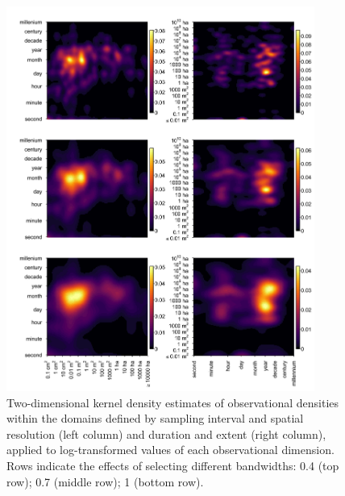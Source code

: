 \documentclass[12pt]{article}
\begin{document}
\begin{figure}[!ht]
\includegraphics[width=0.9\textwidth]{../vignettes/figures/figS6.png}
\vspace{10 pt}
\caption{Two-dimensional kernel density estimates of observational densities within the domains defined by sampling interval and spatial resolution (left column) and duration and extent (right column), applied to log-transformed values of each observational dimension. Rows indicate the effects of selecting different bandwidths: 0.4 (top row); 0.7 (middle row); 1 (bottom row). }
\label{ksens}
\end{figure}
  


\clearpage



\end{document}

